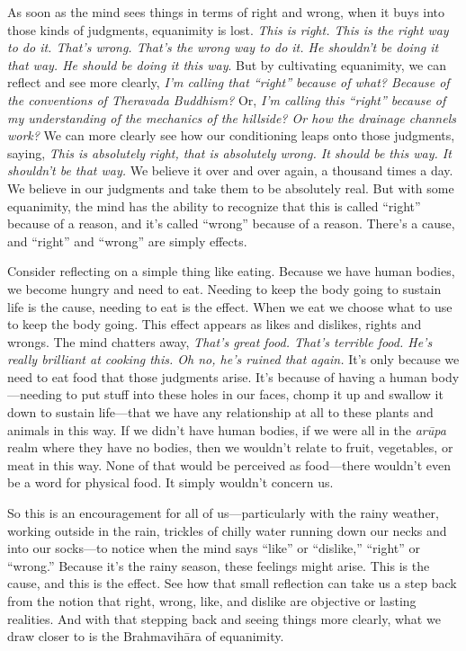 As soon as the mind sees things in terms of right and wrong, when it 
buys into those kinds of judgments, equanimity is lost. \emph{This is 
right. This is the right way to do it. That's wrong. That's the wrong 
way to do it. He shouldn't be doing it that way. He should be doing it 
this way}. But by cultivating equanimity, we can reflect and see more 
clearly, \emph{I'm calling that ``right'' because of what? Because of 
the conventions of Theravada Buddhism?} Or, \emph{I'm calling this 
``right'' because of my understanding of the mechanics of the hillside? 
Or how the drainage channels work?} We can more clearly see how our 
conditioning leaps onto those judgments, saying, \emph{This is 
absolutely right, that is absolutely wrong. It should be this way. It 
shouldn't be that way.} We believe it over and over again, a thousand 
times a day. We believe in our judgments and take them to be absolutely 
real. But with some equanimity, the mind has the ability to recognize 
that this is called ``right'' because of a reason, and it's called 
``wrong'' because of a reason. There's a cause, and ``right'' and 
``wrong'' are simply effects.

Consider reflecting on a simple thing like eating. Because we have 
human bodies, we become hungry and need to eat. Needing to keep the 
body going to sustain life is the cause, needing to eat is the effect. 
When we eat we choose what to use to keep the body going. This effect 
appears as likes and dislikes, rights and wrongs. The mind chatters 
away, \emph{That's great food. That's terrible food. He's really 
brilliant at cooking this. Oh no, he's ruined that again.} It's only 
because we need to eat food that those judgments arise. It's because of 
having a human body---needing to put stuff into these holes in our 
faces, chomp it up and swallow it down to sustain life---that we have 
any relationship at all to these plants and animals in this way. If we 
didn't have human bodies, if we were all in the \emph{arūpa} realm 
where they have no bodies, then we wouldn't relate to fruit, 
vegetables, or meat in this way. None of that would be perceived as 
food---there wouldn't even be a word for physical food. It simply 
wouldn't concern us.

So this is an encouragement for all of us---particularly with the rainy 
weather, working outside in the rain, trickles of chilly water running 
down our necks and into our socks---to notice when the mind says 
``like'' or ``dislike,'' ``right'' or ``wrong.'' Because it's the rainy 
season, these feelings might arise. This is the cause, and this is the 
effect. See how that small reflection can take us a step back from the 
notion that right, wrong, like, and dislike are objective or lasting 
realities. And with that stepping back and seeing things more clearly, 
what we draw closer to is the Brahmavihāra of equanimity.

